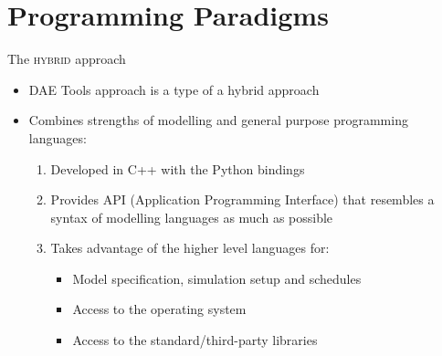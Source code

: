 \documentclass[compress,newPxFont,sthlmFooter]{beamer}
\begin{document}
\section{Programming Paradigms}

\begin{frame}{The \textsc{hybrid} approach}
  \begin{itemize}
    \item DAE Tools approach is a \alert{type of a hybrid approach}
    \item Combines strengths of \alert{modelling} and \alert{general purpose} programming languages:
        \begin{enumerate}
            \item \alert{Developed in C++} with the \alert{Python bindings}
            \item Provides \alert{API} (Application Programming Interface) that \alert{resembles a syntax of modelling languages}
                  as much as possible
            \item \alert{Takes advantage of the higher level languages} for:
                \begin{itemize}
                    \item Model specification, simulation setup and schedules
                    \item Access to the operating system 
                    \item Access to the standard/third-party libraries
                \end{itemize}
        \end{enumerate}
  \end{itemize}
\end{frame}
\end{document}
